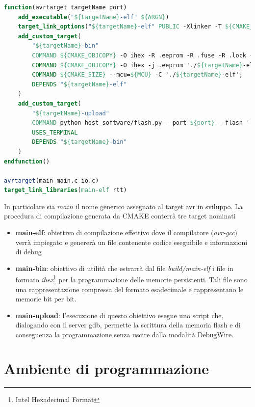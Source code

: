 \noindent\begin{minipage}{\textwidth}
    \begin{lstlisting}[language=CMAKE, caption={Definizione di un target di compilazione e upload per un dispositivo AVR}, label=lst:cmake-target]
function(avrtarget targetName port)
    add_executable("${targetName}-elf" ${ARGN})
    target_link_options("${targetName}-elf" PUBLIC -Xlinker -T ${CMAKE_SOURCE_DIR}/cmake/linker/${MCU}.ld)
    add_custom_target(
        "${targetName}-bin" 
        COMMAND ${CMAKE_OBJCOPY} -O ihex -R .eeprom -R .fuse -R .lock -R .signature './${targetName}-elf' './${targetName}.hex';
        COMMAND ${CMAKE_OBJCOPY} -O ihex -j .eeprom './${targetName}-elf' './${targetName}.eeprom.hex';
        COMMAND ${CMAKE_SIZE} --mcu=${MCU} -C './${targetName}-elf';
        DEPENDS "${targetName}-elf"
    )
    add_custom_target(
        "${targetName}-upload"
        COMMAND python host_software/flash.py --port ${port} --flash './${targetName}.hex' --mcu ${MCU}
        USES_TERMINAL
        DEPENDS "${targetName}-bin"
    )
endfunction()

avrtarget(main main.c io.c)
target_link_libraries(main-elf rtt)
    \end{lstlisting}
\end{minipage}

In particolare sia \(main\) il nome generico assegnato al target avr in sviluppo. La procedura di compilazione generata da CMAKE conterrà tre target nominati
\begin{itemize}
    \item \textbf{main-elf}: obiettivo di compilazione effettivo dove il compilatore (\textit{avr-gcc}) verrà impiegato e genererà un file contenente codice eseguibile e informazioni di debug
    \item \textbf{main-bin}: obiettivo di utilità che estrarrà dal file \textit{build/main-elf} i file in formato \textit{ihex}\footnote{Intel Hexadecimal Format} per la programmazione delle memorie persistenti. Tali file sono una rappresentazione compressa del formato esadecimale\cite{site:ihex} e rappresentano le memorie bit per bit.
    \item \textbf{main-upload}: l'esecuzione di questo obiettivo esegue uno script che, dialogando con il server gdb, permette la scrittura della memoria flash e di conseguenza la programmazione senza uscire dalla modalità DebugWire.
\end{itemize}


\section{Ambiente di programmazione}

